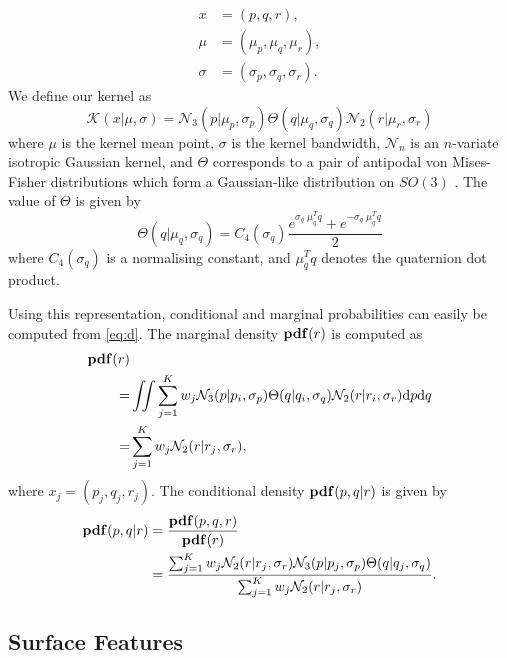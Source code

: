 \begin{subequations}
\begin{align}
x &= (p, q, r),\\
\mu &= (\mu_p, \mu_q, \mu_r),\\
\sigma &= (\sigma_p, \sigma_q, \sigma_r).
\end{align}
\label{eq:feature}
\end{subequations}
We define our kernel as
\begin{equation}\label{eq:kernel_in_se3}
\mathcal{K}(x| \mu, \sigma) = \mathcal{N}_3(p| \mu_p, \sigma_p) \Theta(q| \mu_q, \sigma_q) \mathcal{N}_2(r| \mu_r, \sigma_r)
\end{equation}
where $\mu$ is the kernel mean point, $\sigma$ is the kernel bandwidth, $\mathcal{N}_n$ is an $n$-variate isotropic Gaussian kernel, and ${\Theta}$ corresponds to a pair of antipodal von Mises-Fisher distributions which form a Gaussian-like distribution on $SO(3)$ \cite{fisher1953a,sudderth2006a}. The value of ${\Theta}$ is given by
\begin{equation}
\Theta(q|\mu_q, \sigma_q) = C_4(\sigma_q) \frac {e^{\sigma_q \; \mu_q^T q} + e^{-\sigma_q \; \mu_q^T q}}2
\end{equation}
where $C_4(\sigma_q)$ is a normalising constant, and $\mu_q^T q$ denotes the quaternion dot product.

Using this representation, conditional and marginal probabilities can easily be computed from \eq\eqref{eq:d}. The marginal density $\mathbf{pdf}(r)$ is computed as
\begin{align}\label{eq:marginal}
\mathbf{pdf}(r) & \\
      = & \iint \sum_{j=1}^K w_j \mathcal{N}_3(p| p_i, \sigma_p) \Theta(q| q_i, \sigma_q) \mathcal{N}_2(r| r_i, \sigma_r) \textnormal{d}p\textnormal{d}q \\
      = &  \sum_{j=1}^K w_j \mathcal{N}_2(r| r_j, \sigma_r),
\end{align}
where $x_j = (p_j, q_j, r_j)$.
The  conditional density $\mathbf{pdf}(p,q|r)$ is given by
\begin{align}\label{eq:conditional}
\mathbf{pdf}(p,q|{r}) & = \frac{\mathbf{pdf}(p, q, {r})}{\mathbf{pdf}({r})} \\
                   & = \frac{\sum_{j=1}^K w_j \mathcal{N}_2({r}| r_j, \sigma_r) \mathcal{N}_3(p| p_j, \sigma_p) \Theta(q|q_j, \sigma_q)}{\sum_{j=1}^K w_j \mathcal{N}_2({r}| r_j, \sigma_r)}. 
\end{align}

\subsection{Surface Features}
\label{sec:surface_features}

